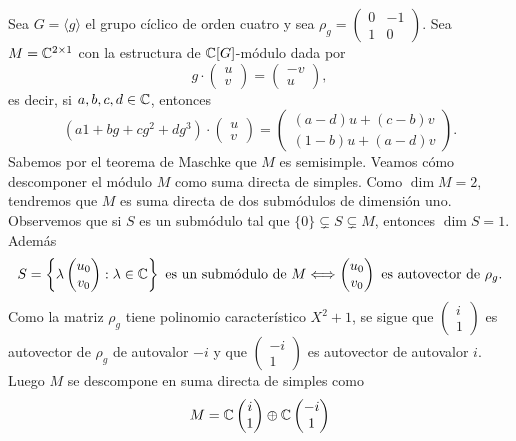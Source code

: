 \begin{example}
Sea $G=\langle g\rangle$ el grupo cíclico de orden cuatro y sea $\rho_g=\begin{pmatrix}
0&-1\\
1&0\end{pmatrix}$. 
Sea $M=\mathbb{C}^{2\times 1}$ con la estructura de $\mathbb{C}[G]$-módulo dada por 
\[
g\cdot\begin{pmatrix}u\\v\end{pmatrix}
=\begin{pmatrix}-v\\u\end{pmatrix},
\]
es decir, si $a,b,c,d\in\mathbb{C}$, entonces 
\[
(a1+bg+cg^2+dg^3)\cdot\begin{pmatrix}u\\v\end{pmatrix}
=\begin{pmatrix}
(a-d)u+(c-b)v\\
(1-b)u+(a-d)v
\end{pmatrix}.
\]
Sabemos por el teorema de Maschke que $M$ es semisimple. Veamos cómo descomponer el módulo $M$ como suma directa de simples. 
Como $\dim M=2$, tendremos que $M$ es suma directa de dos submódulos de dimensión uno. 
Observemos que si $S$ es un submódulo tal que $\{0\}\subsetneq S\subsetneq M$, 
entonces $\dim S=1$. Además 
\[
S=\left\{\lambda\begin{pmatrix}
u_0\\
v_0
\end{pmatrix}:\lambda\in\mathbb{C}\right\}
\text{ es un submódulo de $M$}
\Longleftrightarrow
\begin{pmatrix}
u_0\\
v_0
\end{pmatrix}
\text{ es autovector de $\rho_g$}.
\]
Como la matriz $\rho_g$ tiene polinomio característico $X^2+1$, se sigue 
que  
$\begin{pmatrix}
i\\
1\end{pmatrix}$ es autovector de $\rho_g$ de autovalor $-i$ y que
$\begin{pmatrix}
-i\\
1\end{pmatrix}$ es autovector de autovalor $i$. 
Luego $M$ se descompone en suma directa de simples como 
\[
M=\mathbb{C}\begin{pmatrix}
i\\
1\end{pmatrix}
\oplus
\mathbb{C}
\begin{pmatrix}
-i\\
1\end{pmatrix}
\]
\end{example}

